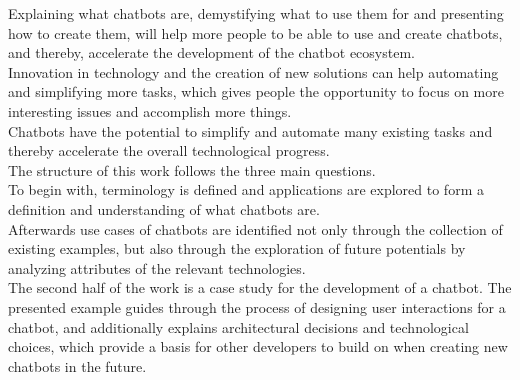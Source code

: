 Explaining what chatbots are, demystifying what to use them for and presenting how to create them,
will help more people to be able to use and create chatbots, and thereby, accelerate the development of the chatbot ecosystem.
\\
Innovation in technology and the creation of new solutions can help automating and simplifying more tasks,
which gives people the opportunity to focus on more interesting issues and accomplish more things.
\\
Chatbots have the potential to simplify and automate many existing tasks and thereby accelerate the overall technological progress.
\\

The structure of this work follows the three main questions.
\\
To begin with, terminology is defined and applications are explored to form a definition and understanding of what chatbots are.
\\
Afterwards use cases of chatbots are identified not only through the collection of existing examples, but also through the exploration of future potentials by analyzing attributes of the relevant technologies.
\\
The second half of the work is a case study for the development of a chatbot.
The presented example guides through the process of designing user interactions for a chatbot, and additionally explains architectural decisions and technological choices, which provide a basis for other developers to build on when creating new chatbots in the future.
